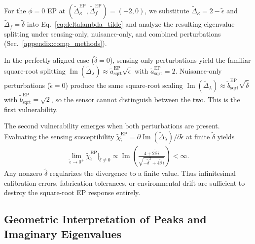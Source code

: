 \documentclass[%
  reprint,
  amsmath,amssymb,
  aps,
  prapplied,
  superscriptaddress,
  longbibliography]{revtex4-2}
\begin{document}
For the $\phi = 0$ EP at $(\tilde{\Delta}_\kappa^\text{EP}, \tilde{\Delta}_f^\text{EP}) = (+2, 0)$, we substitute $\tilde{\Delta}_\kappa = 2 - \tilde{\epsilon}$ and $\tilde{\Delta}_f = \tilde{\delta}$ into Eq.~\ref{eq:deltalambda_tilde} and analyze the resulting eigenvalue splitting under sensing-only, nuisance-only, and combined perturbations (Sec.~\ref{appendix:comp_methods}).

In the perfectly aligned case ($\tilde{\delta} = 0$), sensing-only perturbations yield the familiar square-root splitting $\operatorname{Im}(\tilde{\Delta}_\lambda) \approx \tilde{a}_\text{sqrt}^\text{EP}\sqrt{\tilde{\epsilon}}$ with $\tilde{a}_\text{sqrt}^\text{EP} = 2$. Nuisance-only perturbations ($\tilde{\epsilon} = 0$) produce the same square-root scaling $\operatorname{Im}(\tilde{\Delta}_\lambda) \approx \tilde{b}_\text{sqrt}^\text{EP}\sqrt{\tilde{\delta}}$ with $\tilde{b}_\text{sqrt}^\text{EP} = \sqrt{2}$, so the sensor cannot distinguish between the two. This is the first vulnerability.

The second vulnerability emerges when both perturbations are present. Evaluating the sensing susceptibility $\tilde{\chi}_{\tilde{\epsilon}}^\text{EP} = \partial \operatorname{Im}(\tilde{\Delta}_\lambda)/\partial \tilde{\epsilon}$ at finite $\tilde{\delta}$ yields
\begin{align}
    \lim_{\tilde{\epsilon} \to 0^+} \tilde{\chi}_{\tilde{\epsilon}}^\text{EP} \bigg|_{\tilde{\delta} \neq 0} \propto \operatorname{Im}\left( \frac{4 + 2\tilde{\delta}\,i}{\sqrt{-\tilde{\delta}^2 + 4\tilde{\delta}\,i}} \right) < \infty.
\end{align}
Any nonzero $\tilde{\delta}$ regularizes the divergence to a finite value. Thus infinitesimal calibration errors, fabrication tolerances, or environmental drift are sufficient to destroy the square-root EP response entirely.

\subsection{\label{appendix-sec:geometric_interp}Geometric Interpretation of Peaks and Imaginary Eigenvalues}
\end{document}
